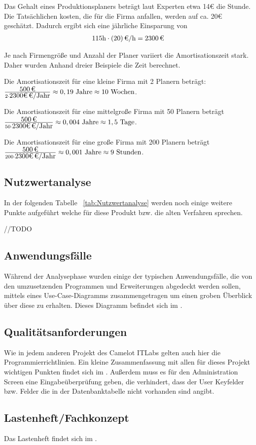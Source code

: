 Das Gehalt eines Produktionsplaners beträgt laut Experten etwa 14€ die Stunde. Die Tatsächlichen kosten, die für die Firma anfallen, werden auf ca. 20€ geschätzt.
Dadurch ergibt sich eine jährliche Einsparung von 
\begin{eqnarray}
115 \mbox{h} \cdot \eur{(20)}{\mbox{/h}} = \eur{2300}
\end{eqnarray}

Je nach Firmengröße und Anzahl der Planer variiert die Amortisationszeit stark. Daher wurden Anhand dreier Beispiele die Zeit berechnet.

Die Amortisationszeit für eine kleine Firma mit 2 Planern beträgt:
$\frac{\eur{500}}{2 \cdot \eur{2300€} \mbox{/Jahr} } \approx 0,19 \mbox{ Jahre} \approx 10 \mbox{ Wochen}$.

Die Amortisationszeit für eine mittelgroße Firma mit 50 Planern beträgt
$\frac{\eur{500}}{50 \cdot \eur{2300€} \mbox{/Jahr} } \approx 0,004 \mbox{ Jahre} \approx 1,5 \mbox{ Tage}$.

Die Amortisationszeit für eine große Firma mit 200 Planern beträgt
$\frac{\eur{500}}{200 \cdot \eur{2300€} \mbox{/Jahr} } \approx 0,001 \mbox{ Jahre} \approx 9 \mbox{ Stunden}$.

\subsection{Nutzwertanalyse}
\label{sec:Nutzwertanalyse}
In der folgenden Tabelle ~\ref{tab:Nutzwertanalyse} werden noch einige weitere Punkte aufgeführt welche für diese Produkt bzw. die alten Verfahren sprechen.

//TODO

\subsection{Anwendungsfälle}
\label{sec:Anwendungsfaelle}
Während der Analysephase wurden einige der typischen Anwendungsfälle, die von den umzusetzenden Programmen und Erweiterungen abgedeckt werden sollen, mittels eines Use-Case-Diagramms zusammengetragen um einen groben Überblick über diese zu erhalten. Dieses Diagramm befindet sich im .

\subsection{Qualitätsanforderungen}
\label{sec:Qualitaetsanforderungen}
Wie in jedem anderen Projekt des Camelot ITLabs gelten auch hier die Programmierrichtlinien. Ein kleine Zusammenfassung mit allen für dieses Projekt wichtigen Punkten findet sich im . Außerdem muss es für den Administration Screen eine Eingabeüberprüfung geben, die verhindert, dass der User Keyfelder bzw. Felder die in der Datenbanktabelle nicht vorhanden sind angibt.

\subsection{Lastenheft/Fachkonzept}
\label{sec:Lastenheft}
Das Lastenheft findet sich im . 


